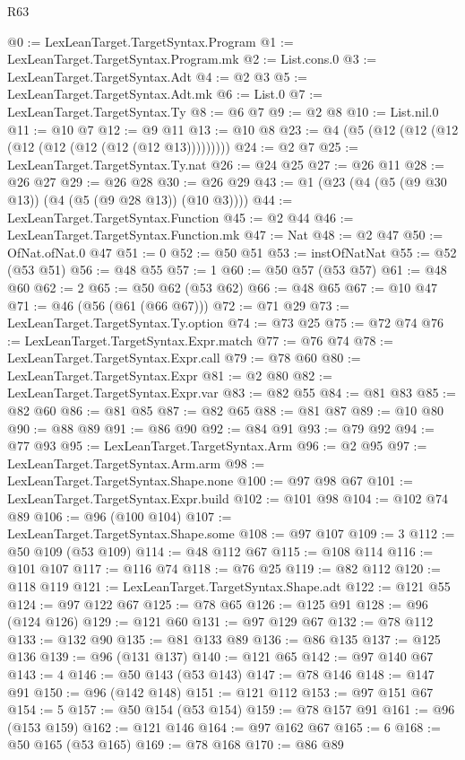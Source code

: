 \begin{lexlean}{R63}
\begin{coremodule}
@0 := LexLeanTarget.TargetSyntax.Program
@1 := LexLeanTarget.TargetSyntax.Program.mk
@2 := List.cons.{0}
@3 := LexLeanTarget.TargetSyntax.Adt
@4 := @2 @3
@5 := LexLeanTarget.TargetSyntax.Adt.mk
@6 := List.{0}
@7 := LexLeanTarget.TargetSyntax.Ty
@8 := @6 @7
@9 := @2 @8
@10 := List.nil.{0}
@11 := @10 @7
@12 := @9 @11
@13 := @10 @8
@23 := @4 (@5 (@12 (@12 (@12 (@12 (@12 (@12 (@12 (@12 @13)))))))))
@24 := @2 @7
@25 := LexLeanTarget.TargetSyntax.Ty.nat
@26 := @24 @25
@27 := @26 @11
@28 := @26 @27
@29 := @26 @28
@30 := @26 @29
@43 := @1 (@23 (@4 (@5 (@9 @30 @13)) (@4 (@5 (@9 @28 @13)) (@10 @3))))
@44 := LexLeanTarget.TargetSyntax.Function
@45 := @2 @44
@46 := LexLeanTarget.TargetSyntax.Function.mk
@47 := Nat
@48 := @2 @47
@50 := OfNat.ofNat.{0} @47
@51 := 0
@52 := @50 @51
@53 := instOfNatNat
@55 := @52 (@53 @51)
@56 := @48 @55
@57 := 1
@60 := @50 @57 (@53 @57)
@61 := @48 @60
@62 := 2
@65 := @50 @62 (@53 @62)
@66 := @48 @65
@67 := @10 @47
@71 := @46 (@56 (@61 (@66 @67)))
@72 := @71 @29
@73 := LexLeanTarget.TargetSyntax.Ty.option
@74 := @73 @25
@75 := @72 @74
@76 := LexLeanTarget.TargetSyntax.Expr.match
@77 := @76 @74
@78 := LexLeanTarget.TargetSyntax.Expr.call
@79 := @78 @60
@80 := LexLeanTarget.TargetSyntax.Expr
@81 := @2 @80
@82 := LexLeanTarget.TargetSyntax.Expr.var
@83 := @82 @55
@84 := @81 @83
@85 := @82 @60
@86 := @81 @85
@87 := @82 @65
@88 := @81 @87
@89 := @10 @80
@90 := @88 @89
@91 := @86 @90
@92 := @84 @91
@93 := @79 @92
@94 := @77 @93
@95 := LexLeanTarget.TargetSyntax.Arm
@96 := @2 @95
@97 := LexLeanTarget.TargetSyntax.Arm.arm
@98 := LexLeanTarget.TargetSyntax.Shape.none
@100 := @97 @98 @67
@101 := LexLeanTarget.TargetSyntax.Expr.build
@102 := @101 @98
@104 := @102 @74 @89
@106 := @96 (@100 @104)
@107 := LexLeanTarget.TargetSyntax.Shape.some
@108 := @97 @107
@109 := 3
@112 := @50 @109 (@53 @109)
@114 := @48 @112 @67
@115 := @108 @114
@116 := @101 @107
@117 := @116 @74
@118 := @76 @25
@119 := @82 @112
@120 := @118 @119
@121 := LexLeanTarget.TargetSyntax.Shape.adt
@122 := @121 @55
@124 := @97 @122 @67
@125 := @78 @65
@126 := @125 @91
@128 := @96 (@124 @126)
@129 := @121 @60
@131 := @97 @129 @67
@132 := @78 @112
@133 := @132 @90
@135 := @81 @133 @89
@136 := @86 @135
@137 := @125 @136
@139 := @96 (@131 @137)
@140 := @121 @65
@142 := @97 @140 @67
@143 := 4
@146 := @50 @143 (@53 @143)
@147 := @78 @146
@148 := @147 @91
@150 := @96 (@142 @148)
@151 := @121 @112
@153 := @97 @151 @67
@154 := 5
@157 := @50 @154 (@53 @154)
@159 := @78 @157 @91
@161 := @96 (@153 @159)
@162 := @121 @146
@164 := @97 @162 @67
@165 := 6
@168 := @50 @165 (@53 @165)
@169 := @78 @168
@170 := @86 @89

\end{coremodule}
\end{lexlean}
